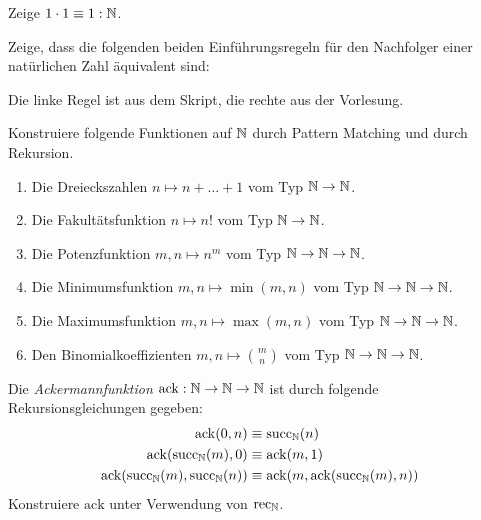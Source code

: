 \documentclass{uebung}
\begin{document}

\begin{exercise}
  Zeige $1\cdot 1\equiv 1:\mathbb{N}$.
\end{exercise}

\begin{exercise}
  Zeige, dass die folgenden beiden Einführungsregeln für den Nachfolger einer natürlichen Zahl äquivalent sind:
  {\tiny Die linke Regel ist aus dem Skript, die rechte aus der Vorlesung.}
\end{exercise}

\begin{exercise}
  Konstruiere folgende Funktionen auf $\mathbb{N}$ durch Pattern Matching und durch Rekursion.
  \begin{enumerate}
    \item Die Dreieckszahlen $n\mapsto n+\dots+1$ vom Typ $\mathbb{N}\to\mathbb{N}$.
    \item Die Fakultätsfunktion $n\mapsto n!$ vom Typ $\mathbb{N}\to\mathbb{N}$.
    \item Die Potenzfunktion $m,n\mapsto n^m$ vom Typ $\mathbb{N}\to\mathbb{N}\to\mathbb{N}$.
    \item Die Minimumsfunktion $m,n\mapsto\min(m,n)$ vom Typ $\mathbb{N}\to\mathbb{N}\to\mathbb{N}$.
    \item Die Maximumsfunktion $m,n\mapsto\max(m,n)$ vom Typ $\mathbb{N}\to\mathbb{N}\to\mathbb{N}$.
    \item Den Binomialkoeffizienten $m,n\mapsto\binom{m}{n}$ vom Typ $\mathbb{N}\to\mathbb{N}\to\mathbb{N}$.
  \end{enumerate}
\end{exercise}

\begin{exercise}
  Die \emph{Ackermannfunktion} $\mathrm{ack}:\mathbb{N}\to\mathbb{N}\to\mathbb{N}$ ist durch folgende Rekursionsgleichungen gegeben:
  \begin{align*}
    \mathrm{ack}(0,n)&\equiv\mathrm{succ}_{\mathbb{N}}(n)\\
    \mathrm{ack}(\mathrm{succ}_{\mathbb{N}}(m),0)&\equiv\mathrm{ack}(m,1)\\
    \mathrm{ack}(\mathrm{succ}_{\mathbb{N}}(m),\mathrm{succ}_{\mathbb{N}}(n))&\equiv\mathrm{ack}(m,\mathrm{ack}(\mathrm{succ}_{\mathbb{N}}(m),n))
  \end{align*}
  Konstruiere $\mathrm{ack}$ unter Verwendung von $\mathrm{rec}_{\mathbb{N}}$.
\end{exercise}
\end{document}
